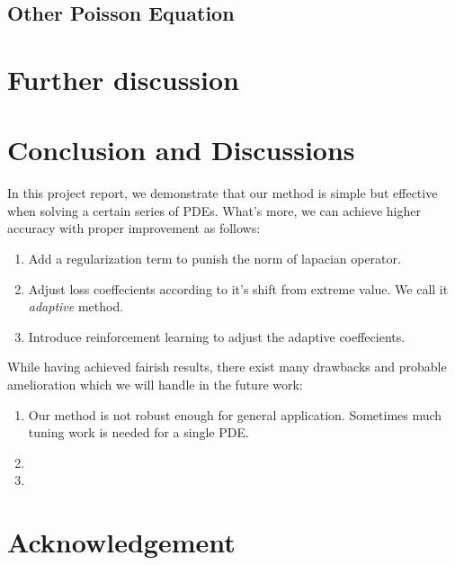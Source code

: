 \documentclass{article}
\begin{document}
\subsection{Other Poisson Equation}


\section{Further discussion}

\section{Conclusion and Discussions}

In this project report, we demonstrate that our method is simple but effective when solving a certain series of PDEs. What's more, we can achieve higher accuracy with proper improvement as follows:

\begin{enumerate}
\item
Add a regularization term to punish the norm of lapacian operator. 
\item
Adjust loss coeffecients according to it's shift from  extreme value. We call it \emph{adaptive} method.
\item
Introduce reinforcement learning to adjust the adaptive coeffecients.
\end{enumerate}

While having achieved fairish results, there exist many drawbacks and probable amelioration which we will handle in the future work:

\begin{enumerate}
\item
Our method is not robust enough for general application. Sometimes much tuning work is needed for a single PDE.
\item

\item

\end{enumerate}

\section*{Acknowledgement}




\medskip

\small
\end{document}
